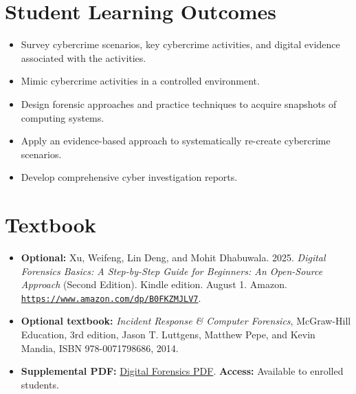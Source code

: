 \documentclass[10pt]{article}
\begin{document}
\section{Student Learning Outcomes}
\begin{itemize}
  \item Survey cybercrime scenarios, key cybercrime activities, and digital evidence associated with the activities.
  \item Mimic cybercrime activities in a controlled environment.
  \item Design forensic approaches and practice techniques to acquire snapshots of computing systems.
  \item Apply an evidence-based approach to systematically re-create cybercrime scenarios.
  \item Develop comprehensive cyber investigation reports.
\end{itemize}

\section{Textbook}
\begin{itemize}
  \item \textbf{Optional:} Xu, Weifeng, Lin Deng, and Mohit Dhabuwala. 2025. \emph{Digital Forensics Basics: A Step-by-Step Guide for Beginners: An Open-Source Approach} (Second Edition). Kindle edition. August 1. Amazon. \href{https://www.amazon.com/dp/B0FKZMJLV7}{\nolinkurl{https://www.amazon.com/dp/B0FKZMJLV7}}.
  \item \textbf{Optional textbook:} \emph{Incident Response \& Computer Forensics}, McGraw-Hill Education, 3rd edition, Jason T. Luttgens, Matthew Pepe, and Kevin Mandia, ISBN 978-0071798686, 2014.
  \item \textbf{Supplemental PDF:} \href{https://github.com/frankwxu/digital-forensics-lab/blob/main/papers/books/Digital_Forensics_Andriod.pdf}{Digital Forensics PDF}. \textbf{Access:} Available to enrolled students.
\end{itemize}

\end{document}

